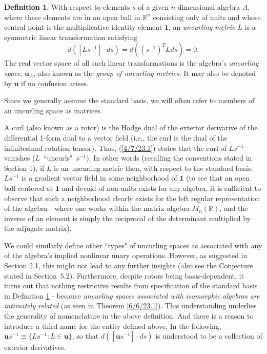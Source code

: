 \documentclass{amsart}
\numberwithin{equation}{section}
\theoremstyle{definition}
\newtheorem{definition}[theorem]{Definition}
\numberwithin{theorem}{section}
\begin{document}
     
       
         \begin{definition}\label{7/21/23.1} With respect to elements $s$ of a given $n$-dimensional algebra $A$, where these elements are in an open ball in $\mathbb{R}^n$ consisting only of units and whose central point is the multiplicative identity element $\mathbf{1}$, an  {\it uncurling metric $L$} is a symmetric linear transformation  satisfying \begin{equation}\label{4/7/23.1} d([Ls^{-1}]\cdot ds) = d\left((s^{-1})^T L ds\right) = 0. \end{equation}  The real vector space of all such linear transformations is the algebra's {\it uncurling space}, $\mathbf{u}_A$, also known as the {\it group of uncurling metrics}.  It may also be denoted by $\mathbf{u}$ if no confusion arises.    \end{definition}

 
Since we generally assume the standard basis, we will often refer to members of an uncurling space as matrices.

 A curl (also known as a rotor) is the Hodge dual of the exterior derivative of the differential \mbox{1-form} dual to a vector field (i.e., the curl is the dual of the infinitesimal rotation tensor).  Thus,  (\ref{4/7/23.1}) states that the curl of $Ls^{-1}$ vanishes (\mbox{$L$ ``uncurls" $s^{-1}$}).    In other words (recalling the conventions stated in Section 1), if $L$ is an uncurling metric then, with respect to the standard basis, $Ls^{-1}$ is a gradient vector field in some neighborhood of $\mathbf{1}$ (to see that an open ball centered at $\mathbf{1}$ and devoid of non-units exists for any algebra, it is sufficient to observe that such a neighborhood clearly exists for the left regular representation of the algebra - where one works within the matrix algebra $ M_n(\mathbb{R})$, and the inverse of an element is simply the reciprocal of the determinant multiplied by the adjugate matrix).
 
 We could similarly define other ``types" of uncurling spaces as associated with any of the algebra's implied nonlinear unary operations.  However, as suggested in Section 2.1, this might not lead to any further insights (also see the Conjecture stated in \mbox{Section 5.2}).  Furthermore, despite rotors being basis-dependent, it turns out that nothing restrictive results from specification of the standard basis in Definition \ref{7/21/23.1} - because {\it uncurling spaces associated with isomorphic algebras are intimately related} (as seen in Theorem \ref{6/6/23.1}).  This understanding underlies the generality of nomenclature in the above definition.  And there is a reason to introduce a third name for the entity defined above.  In the following, $\mathbf{u}s^{-1} \equiv \{Ls^{-1}:L\in \mathbf{u}\}$, so that $d([\mathbf{u}s^{-1}]\cdot ds)$ is understood to be a collection of exterior derivatives. 
  
\end{document}
